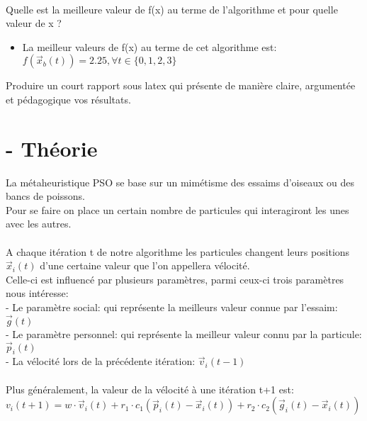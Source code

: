 \noindent
\\Quelle est la meilleure valeur
de f(x) au terme de l’algorithme et pour quelle valeur de x ? 
\begin{itemize}
\item
La meilleur valeurs de f(x) au terme de cet algorithme est: $f(\vec{x}_b(t)) = 2.25, \forall t \in \{0,1,2,3\}$
\end{itemize}


\begin{itemize}

\end{itemize}

%
%

\vspace{5mm}
\noindent
{}
\vspace{2mm}

\noindent
Produire un court rapport sous latex qui présente de manière claire, argumentée et pédagogique
vos résultats.

\section{- Théorie}

La métaheuristique PSO se base sur un mimétisme des essaims d'oiseaux ou des bancs de poissons.\\
Pour se faire on place un certain nombre de particules qui interagiront les unes avec les autres.\\

\\
A chaque itération t de notre algorithme les particules changent leurs positions $\vec{x}_i(t)$ d'une certaine valeur que l'on appellera vélocité.\\
Celle-ci est influencé par plusieurs paramètres, parmi ceux-ci trois paramètres nous intéresse: \\
- Le paramètre social: qui représente la meilleurs valeur connue par l'essaim: $\vec{g}(t)$ \\
- Le paramètre personnel: qui représente la meilleur valeur connu par la particule: $\vec{p}_i(t)$ \\
- La vélocité lors de la précédente itération: $\vec{v}_i(t-1)$\\
\\
Plus généralement, la valeur de la vélocité à une itération t+1 est:\\
$v_i(t+1) = w \cdot \vec{v}_i(t) + r_1 \cdot c_1 (\vec{p}_i(t) - \vec{x}_i(t)) + r_2 \cdot c_2( \vec{g}_i(t) - \vec{x}_i(t))$ 
\\
\\
\\
\\
